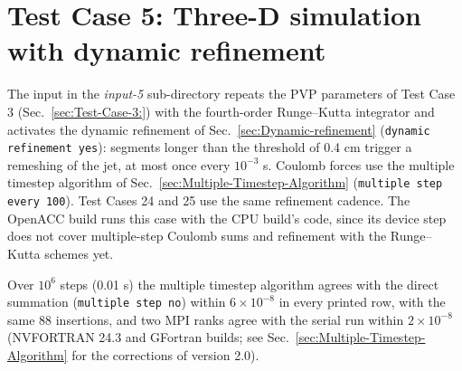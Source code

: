 \section{Test Case 5: Three-D simulation with dynamic refinement}

The input in the \textit{input-5} sub-directory repeats the PVP parameters
of Test Case 3 (Sec.~\ref{sec:Test-Case-3:}) with the fourth-order
Runge--Kutta integrator and activates the dynamic refinement of
Sec.~\ref{sec:Dynamic-refinement} (\texttt{dynamic refinement yes}):
segments longer than the threshold of 0.4 cm trigger a remeshing of the jet,
at most once every $10^{-3}$ s.  Coulomb forces use the multiple timestep
algorithm of Sec.~\ref{sec:Multiple-Timestep-Algorithm}
(\texttt{multiple step every 100}).  Test Cases 24 and 25 use the same
refinement cadence.  The OpenACC build runs this case with the CPU build's
code, since its device step does not cover multiple-step Coulomb sums and
refinement with the Runge--Kutta schemes yet.

Over $10^{6}$ steps (0.01 s) the multiple timestep algorithm agrees with the
direct summation (\texttt{multiple step no}) within $6\times10^{-8}$ in
every printed row, with the same 88 insertions, and two MPI ranks agree with
the serial run within $2\times10^{-8}$ (NVFORTRAN 24.3 and GFortran builds;
see Sec.~\ref{sec:Multiple-Timestep-Algorithm} for the corrections of
version 2.0).
